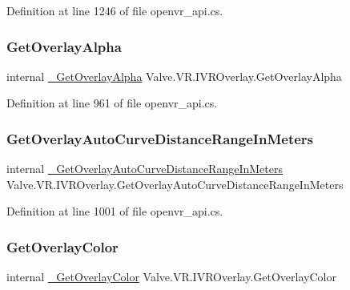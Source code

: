Definition at line 1246 of file openvr\+\_\+api.\+cs.

\mbox{\label{struct_valve_1_1_v_r_1_1_i_v_r_overlay_ad03e7b532414a413e53d3f90cf30886a}} 
\subsubsection{\texorpdfstring{GetOverlayAlpha}{GetOverlayAlpha}}
{\footnotesize\ttfamily internal \mbox{\hyperlink{struct_valve_1_1_v_r_1_1_i_v_r_overlay_aaaf6e210a7faf2e505719a884eef3529}{\+\_\+\+Get\+Overlay\+Alpha}} Valve.\+V\+R.\+I\+V\+R\+Overlay.\+Get\+Overlay\+Alpha}



Definition at line 961 of file openvr\+\_\+api.\+cs.

\mbox{\label{struct_valve_1_1_v_r_1_1_i_v_r_overlay_aef6b5d79ecdb49dc66521e6ec46c345e}} 
\subsubsection{\texorpdfstring{GetOverlayAutoCurveDistanceRangeInMeters}{GetOverlayAutoCurveDistanceRangeInMeters}}
{\footnotesize\ttfamily internal \mbox{\hyperlink{struct_valve_1_1_v_r_1_1_i_v_r_overlay_aea87edea8fd7762358e5a3d3dfd94345}{\+\_\+\+Get\+Overlay\+Auto\+Curve\+Distance\+Range\+In\+Meters}} Valve.\+V\+R.\+I\+V\+R\+Overlay.\+Get\+Overlay\+Auto\+Curve\+Distance\+Range\+In\+Meters}



Definition at line 1001 of file openvr\+\_\+api.\+cs.

\mbox{\label{struct_valve_1_1_v_r_1_1_i_v_r_overlay_ae2b6ac0167c173fd45f73b00ee14d030}} 
\subsubsection{\texorpdfstring{GetOverlayColor}{GetOverlayColor}}
{\footnotesize\ttfamily internal \mbox{\hyperlink{struct_valve_1_1_v_r_1_1_i_v_r_overlay_a8a389fa30b6c03914919dca699444cdd}{\+\_\+\+Get\+Overlay\+Color}} Valve.\+V\+R.\+I\+V\+R\+Overlay.\+Get\+Overlay\+Color}



